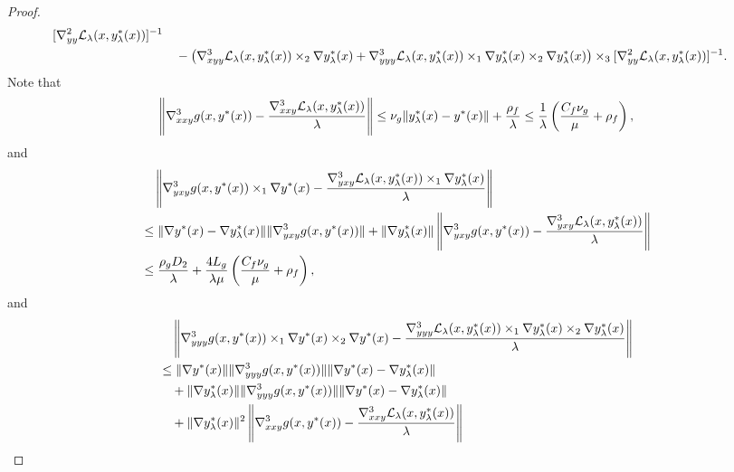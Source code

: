 \begin{proof}
{\begin{align}
\begin{split}
        [ \nabla_{yy}^2 {\mathcal{L}}_{\lambda}(x,y_{\lambda}^*(x))  ]^{-1} \\
        &\quad - \left(
        \nabla_{xyy}^3 {\mathcal{L}}_{\lambda}(x,y_{\lambda}^*(x))
        \times_2
        \nabla y_{\lambda}^*(x)   +  
         \nabla_{yyy}^3 {\mathcal{L}}_{\lambda} (x,y_{\lambda}^*(x))
        \times_1 \nabla y_{\lambda}^*(x)
        \times_2 \nabla y_{\lambda}^*(x) 
        \right) \times_3 [ \nabla_{yy}^2 {\mathcal{L}}_{\lambda}(x,y_{\lambda}^*(x))]^{-1}.
    \end{split}
    \end{align}}
Note that 
\begin{align*}
    \left \Vert  \nabla_{xxy}^3  g(x,y^*(x)) - \frac{\nabla_{xxy}^3 {\mathcal{L}}_{\lambda} (x,y_{\lambda}^*(x))  }{\lambda}   \right \Vert \le \nu_g \Vert y_{\lambda}^*(x) - y^*(x) \Vert + \frac{\rho_f}{\lambda} \le \frac{1}{\lambda} \left(\frac{C_f \nu_g}{\mu} +\rho_f \right),
\end{align*}
and
\begin{align*}
    &\quad \left \Vert 
    \nabla_{yxy}^3 g(x,y^*(x)) \times_1 \nabla y^*(x)  - \frac{\nabla_{yxy}^3 {\mathcal{L}}_{\lambda} (x,y_{\lambda}^*(x)) \times_1 \nabla y_{\lambda}^*(x) }{\lambda}
    \right \Vert \\
    &\le \Vert \nabla y^*(x) - \nabla y_{\lambda}^*(x) \Vert \Vert \nabla_{yxy}^3 g(x,y^*(x)) \Vert + \Vert \nabla y_{\lambda}^*(x) \Vert \left\Vert \nabla_{yxy}^3 g(x,y^*(x)) - \frac{\nabla_{yxy}^3 {\mathcal{L}}_{\lambda}(x, y_{\lambda}^*(x))}{\lambda} \right \Vert \\
    &\le \frac{\rho_g D_2}{\lambda} + \frac{4L_g}{\lambda \mu} \left( \frac{C_f \nu_g}{\mu} + \rho_f \right),
\end{align*}
and
{ 
\begin{align*}
    &\quad  \left \Vert
   \nabla_{yyy}^3 g(x,y^*(x)) \times_1  \nabla y^*(x)  \times_2 \nabla y^*(x)  - \frac{\nabla_{yyy}^3 \fL_{\lambda} (x,y_{\lambda}^*(x)) \times_1 \nabla y_{\lambda}^*(x) \times_2  \nabla y_{\lambda}^*(x)} { \lambda}
    \right \Vert \\
    &\le \Vert \nabla y^*(x) \Vert \Vert \nabla_{yyy}^3 g(x,y^*(x))\Vert \Vert \nabla y^*(x) - \nabla y_{\lambda}^*(x) \Vert  \\
    &\quad + \Vert \nabla y_{\lambda}^*(x) \Vert \Vert \nabla_{yyy}^3 g(x,y^*(x))\Vert \Vert \nabla y^*(x) - \nabla y_{\lambda}^*(x) \Vert  \\
    &\quad +  \Vert \nabla y_{\lambda}^*(x) \Vert^2  \left \Vert  \nabla_{xxy}^3  g(x,y^*(x)) - \frac{\nabla_{xxy}^3 \fL_{\lambda} (x,y_{\lambda}^*(x))  }{\lambda}   \right \Vert \\

\end{align*}}
\end{proof}

